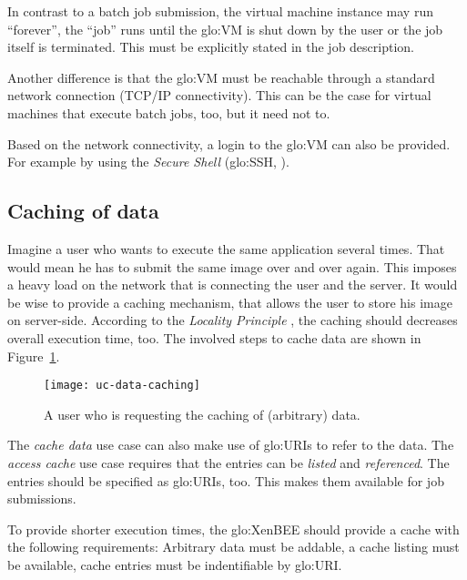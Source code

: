 In contrast  to a batch job  submission, the virtual  machine instance may
run ``forever'', \ie the ``job''  runs until the \gls{glo:VM} is shut down
by the  user or  the job  itself is terminated.   This must  be explicitly
stated in the job description.

Another difference  is that the  \gls{glo:VM} must be reachable  through a
standard network  connection (\eg TCP/IP  connectivity).  This can  be the
case for  virtual machines that execute  batch jobs, too, but  it need not
to.

Based on the network connectivity, a login to the \gls{glo:VM} can also be
provided.  For  example by  using the \emph{Secure  Shell} (\gls{glo:SSH},
\cite{openssh}).

\subsection{Caching of data}
\label{sec:uc-data-caching}

Imagine a  user who wants to  execute the same  application several times.
That would mean he has to submit  the same image over and over again. This
imposes a  heavy load on the network  that is connecting the  user and the
server. It would  be wise to provide a caching  mechanism, that allows the
user to  store his image  on server-side. According to  the \emph{Locality
  Principle}  \cite{locality-principle},   the  caching  should  decreases
overall execution time,  too.  The involved steps to  cache data are shown
in  Figure~\ref{fig:uc-data-caching}.

\begin{figure}[h]
  \centering
  \texttt{[image: uc-data-caching]}
  \caption[UC  Data  Caching]{A user  who  is  requesting  the caching  of
    (arbitrary) data.}
  \label{fig:uc-data-caching}
\end{figure}

The  \emph{cache data} use  case can  also make  use of  \gls{glo:URI}s to
refer to  the data.   The \emph{access cache}  use case requires  that the
entries can be \emph{listed}  and \emph{referenced}. The entries should be
specified  as \gls{glo:URI}s,  too.   This makes  them  available for  job
submissions.

To provide shorter execution times, the \gls{glo:XenBEE} should provide a
cache with the following requirements: Arbitrary data must be addable, a
cache listing must be available, cache entries must be indentifiable by
\gls{glo:URI}.

